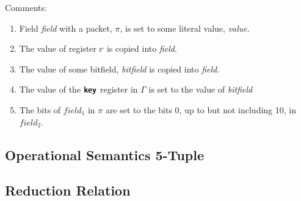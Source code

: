 Comments:
\begin{enumerate}
\item Field \textit{field} with a packet, $\pi$, is set to some literal value, \textit{value}.
\item The value of register $\mathbb{r}$ is copied into \textit{field}.
\item The value of some bitfield, \textit{bitfield} is copied into \textit{field}.
\item The value of the $\bm{\mathsf{{key}}}$ register in $\Gamma$ is set to the value of \textit{bitfield}
\item The bits of $field_1$ in $\pi$ are set to the bits 0, up to but not including 10, in $field_2$.
\end{enumerate}


\subsection{Operational Semantics 5-Tuple}

\subsection{Reduction Relation}
\setlength{\mathindent}{0pt}

